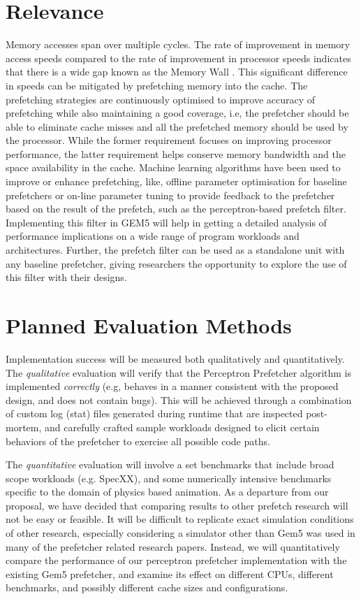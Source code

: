 \documentclass[conference]{IEEEtran}
\begin{document}
\section{Relevance}
Memory accesses span over multiple cycles. The rate of improvement in memory access speeds compared to the rate of improvement in processor speeds indicates that there is a wide gap known as the Memory Wall \cite{mem-wall}. This significant difference in speeds can be mitigated by prefetching memory into the cache. The prefetching strategies are continuously optimised to improve accuracy of prefetching while also maintaining a good coverage, i.e, the prefetcher should be able to eliminate cache misses and all the prefetched memory should be used by the processor. While the former requirement focuses on improving processor performance, the latter requirement helps conserve memory bandwidth and the space availability in the cache. Machine learning algorithms have been used to improve or enhance prefetching, like, offline parameter optimisation for baseline prefetchers or on-line parameter tuning to provide feedback to the prefetcher based on the result of the prefetch, such as the perceptron-based prefetch filter\cite{ppf}. Implementing this filter in GEM5 will help in getting a detailed analysis of performance implications on a wide range of program workloads and architectures.  Further, the prefetch filter can be used as a standalone unit with any baseline prefetcher, giving researchers the opportunity to explore the use of this filter with their designs.

\section{Planned Evaluation Methods}

Implementation success will be measured both qualitatively and quantitatively. The \textit{qualitative} evaluation will verify that the Perceptron Prefetcher algorithm is implemented \textit{correctly} (e.g, behaves in a manner consistent with the proposed design, and does not contain bugs). This will be achieved through a combination of custom log (stat) files generated during runtime that are inspected post-mortem, and carefully crafted sample workloads designed to elicit certain behaviors of the prefetcher to exercise all possible code paths. 

The \textit{quantitative} evaluation will involve a set benchmarks that include broad scope workloads (e.g. SpecXX), and some numerically intensive benchmarks specific to the domain of physics based animation. As a departure from our proposal, we have decided that comparing results to other prefetch research will not be easy or feasible. It will be difficult to replicate exact simulation conditions of other research, especially considering a simulator other than Gem5 was used in many of the prefetcher related research papers. Instead, we will quantitatively compare the performance of our perceptron prefetcher implementation with the existing Gem5 prefetcher, and examine its effect on different CPUs, different benchmarks, and possibly different cache sizes and configurations.  
\end{document}
